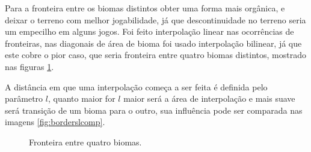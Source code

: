 Para a fronteira entre os biomas distintos obter uma forma mais orgânica, e deixar o 
terreno com melhor jogabilidade, já que descontinuidade no terreno seria um empecilho em alguns jogos.
Foi feito interpolação linear nas ocorrências de fronteiras, nas diagonais de área de bioma foi 
usado interpolação bilinear, já que este cobre o pior caso, que seria fronteira entre quatro biomas distintos,
mostrado nas figuras \ref{fig:wcborder4biomes}.%

A distância em que uma interpolação começa a ser feita é definida pelo parâmetro $l$,
quanto maior for $l$ maior será a área de interpolação e mais suave será transição de um bioma para o outro,
sua influência pode ser comparada nas imagens \ref{fig:borderslcomp}.

\begin{figure}[H]
     \centering
     \hspace{0.1cm}
     
     \caption{Fronteira entre quatro biomas.}
     
     \label{fig:wcborder4biomes}
\end{figure}

